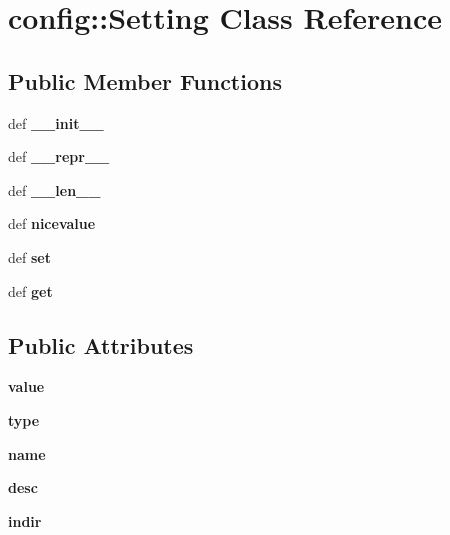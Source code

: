\section{config::Setting Class Reference}
\label{classconfig_1_1Setting}
\subsection*{Public Member Functions}
\begin{CompactItemize}
\item 
def \textbf{\_\-\_\-init\_\-\_\-}\label{classconfig_1_1Setting_35b9ebab891e3a161114d50fb4d65294}

\item 
def \textbf{\_\-\_\-repr\_\-\_\-}\label{classconfig_1_1Setting_4904c70f691db977eba0b228012a72b0}

\item 
def \textbf{\_\-\_\-len\_\-\_\-}\label{classconfig_1_1Setting_98bef14ea89555c26cc4e02f48ebdcb7}

\item 
def \textbf{nicevalue}\label{classconfig_1_1Setting_dcca335cde081812584a40c5eefb1f82}

\item 
def \textbf{set}\label{classconfig_1_1Setting_b057dd7a713a36f557b833cbe362c923}

\item 
def \textbf{get}\label{classconfig_1_1Setting_69f6857bc7f1727b15b86c24d4f66620}

\end{CompactItemize}
\subsection*{Public Attributes}
\begin{CompactItemize}
\item 
\textbf{value}\label{classconfig_1_1Setting_cf2fe89efdf7edea829aeab46fbf843c}

\item 
\textbf{type}\label{classconfig_1_1Setting_6e1082d73c3198d53d3fe5ffac006f7f}

\item 
\textbf{name}\label{classconfig_1_1Setting_b6987fbf7ad944fea26158b742e55b47}

\item 
\textbf{desc}\label{classconfig_1_1Setting_4b2d266691fa4fa90db04852f55ba30e}

\item 
\textbf{indir}\label{classconfig_1_1Setting_50adc4cb88d19d0e03bb9dfbb4dd2d74}

\end{CompactItemize}


